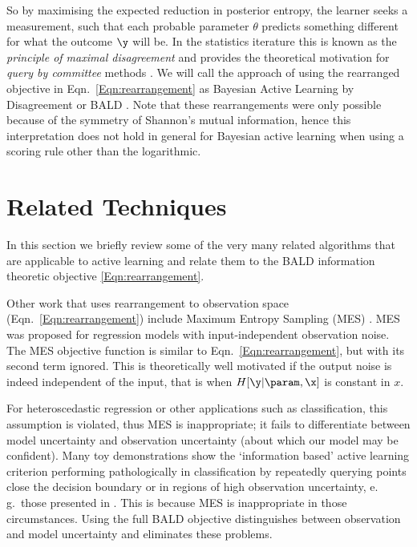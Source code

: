 So by maximising the expected reduction in posterior entropy, the learner seeks a measurement, such that each probable parameter $\theta$ predicts something different for what the outcome $\y$ will be. In the statistics iterature  this is known as the \emph{principle of maximal disagreement} and provides the theoretical motivation for \emph{query by committee} methods \citep{seung1997}. We will call the approach of using the rearranged objective in Eqn.\ \eqref{Eqn:rearrangement} as Bayesian Active Learning by Disagreement or BALD \citep{Houlsby2011,Houlsby2012preference,Huszar2012quantum}. Note that these rearrangements were only possible because of the symmetry of Shannon's mutual information, hence this interpretation does not hold in general for Bayesian active learning when using a scoring rule other than the logarithmic.

\section{Related Techniques}

In this section we briefly review some of the very many related algorithms that are applicable to active learning and relate them to the BALD information theoretic objective \eqref{Eqn:rearrangement}.

Other work that uses rearrangement to observation space (Eqn.\ \eqref{Eqn:rearrangement}) include Maximum Entropy Sampling (MES) \citep{sebastiani2000}. MES was proposed for regression models with input-independent observation noise. The MES objective function is similar to Eqn.\ \eqref{Eqn:rearrangement}, but with its second term ignored. This is theoretically well motivated if the output noise is indeed independent of the input, that is when $H[\y\vert\param,\x]$ is constant in $x$.

For heteroscedastic regression or other applications such as classification, this assumption is violated, thus MES is inappropriate; it fails to differentiate between model uncertainty and observation uncertainty (about which our model may be confident). Many toy demonstrations show the `information based' active learning criterion performing pathologically in classification by repeatedly querying points close the decision boundary or in regions of high observation uncertainty, e.\,g.\ those presented in \citep{dasgupta2008, huang2010}. This is because MES is inappropriate in those circumstances. Using the full BALD objective distinguishes between observation and model uncertainty and eliminates these problems.

